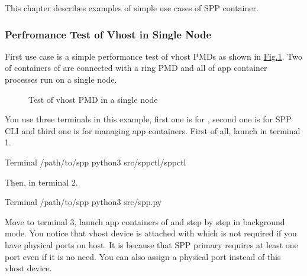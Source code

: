 \documentclass[a4paper,11pt,openany,oneside,english]{sphinxmanual}
\begin{document}
This chapter describes examples of simple use cases of SPP container.


\subsubsection{Perfromance Test of Vhost in Single Node}
\label{\detokenize{tools/sppc/usecases:perfromance-test-of-vhost-in-single-node}}\label{\detokenize{tools/sppc/usecases:sppc-usecases-test-vhost-single}}
First use case is a simple performance test of vhost PMDs as shown in
\hyperref[\detokenize{tools/sppc/usecases:figure-sppc-usecase-vhost}]{Fig.\@ \ref{\detokenize{tools/sppc/usecases:figure-sppc-usecase-vhost}}}.
Two of containers of  are connected with a ring PMD and
all of app container processes run on a single node.

\begin{figure}[htbp]
\centering
\capstart

\noindent{}
\caption{Test of vhost PMD in a single node}\label{\detokenize{tools/sppc/usecases:id1}}\label{\detokenize{tools/sppc/usecases:figure-sppc-usecase-vhost}}\end{figure}

You use three terminals in this example, first one is for ,
second one is for SPP CLI and third one is for managing app containers.
First of all, launch  in terminal 1.

\begin{sphinxVerbatim}[commandchars=\\\{\},formatcom=\footnotesize]
 Terminal 
  /path/to/spp
 python3 src/spp\PYGZhy{}ctl/spp\PYGZhy{}ctl
\end{sphinxVerbatim}

Then,  in terminal 2.

\begin{sphinxVerbatim}[commandchars=\\\{\},formatcom=\footnotesize]
 Terminal 
  /path/to/spp
 python3 src/spp.py
\end{sphinxVerbatim}

Move to terminal 3, launch app containers of 
and  step by step in background mode.
You notice that vhost device is attached with  which is not
required if you have physical ports on host.
It is because that SPP primary requires at least one port even if
it is no need.
You can also assign a physical port instead of this vhost device.
\end{document}
